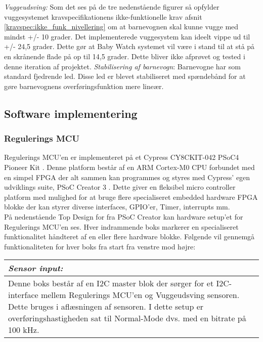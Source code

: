 \textit{Vuggeudsving:}
Som det ses på de tre nedenstående figurer så opfylder vuggesystemet kravspecifikationens ikke-funktionelle krav afsnit \ref{kravspec:ikke_funk_nivellering} om at barnevognen skal kunne vugge med mindst +/- 10 grader. Det implementerede vuggesystem  kan ideelt vippe ud til +/- 24,5 grader. Dette gør at Baby Watch systemet vil være i stand til at stå på en skrånende flade på op til 14,5 grader. Dette bliver ikke afprøvet og tested i denne iteration af projektet. 
\textit{Stabilisering af barnevogn}:
Barnevogne har som standard fjedrende led. Disse led er blevet stabiliseret med spændebånd for at gøre barnevognens overføringsfunktion mere lineær. 

\newpage
\subsection{Software implementering}
\subsubsection{Regulerings MCU}
Regulerings MCU'en er implementeret på et Cypress CY8CKIT-042 PSoC4 Pioneer Kit \citep{website:Cypress}. Denne platform består af en ARM Cortex-M0 CPU forbundet med en simpel FPGA der alt sammen kan programmes og styres med Cypress' egen udviklings suite, PSoC Creator 3 \citep{website:PSoC_Creator}. Dette giver en fleksibel micro controller platform med mulighed for at bruge flere specialiseret embedded hardware FPGA blokke der kan styrer diverse interfaces, GPIO'er, Timer, interrupts mm. \\
På nedenstående Top Design for fra PSoC Creator kan hardware setup'et for Regulerings MCU'en ses. Hver indrammende boks markerer en specialiseret funktionalitet håndteret af en eller flere hardware blokke.
Følgende vil gennemgå funktionaliteten for hver boks fra start fra venstre mod højre:
\begin{center}
    \begin{tabular}{| p{14.5cm} |}
    \hline
    \textit{Sensor input:} \\ \hline
    Denne boks består af en I2C master blok der sørger for et I2C-interface mellem Regulerings MCU'en og Vuggeudsving sensoren. Dette bruges i aflæsningen af sensoren. I dette setup er overføringshastigheden sat til Normal-Mode dvs. med en bitrate på 100 kHz. \\ \hline
    \end{tabular}
\end{center}

